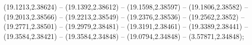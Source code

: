 {(19.1213,2.38624) -- (19.1392,2.38612) -- (19.1598,2.38597) -- (19.1806,2.38582) -- (19.2013,2.38566) -- (19.2213,2.38549) -- (19.2376,2.38536) -- (19.2562,2.3852) -- (19.2771,2.38501) -- (19.2979,2.38481) -- (19.3191,2.38461) -- (19.3389,2.38441) -- (19.3584,2.38421) -- (19.3584,2.34848) -- (19.0794,2.34848) -- (3.57871,2.34848);

}
